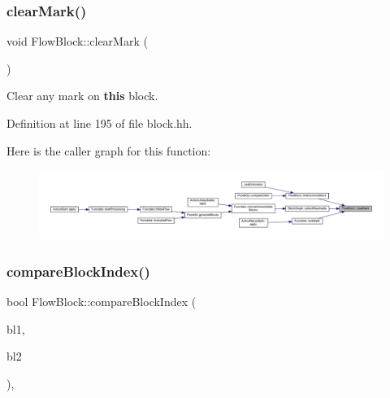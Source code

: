 \subsubsection{\texorpdfstring{clearMark()}{clearMark()}}
{\footnotesize\ttfamily void Flow\+Block\+::clear\+Mark (\begin{DoxyParamCaption}\item[{void}]{ }\end{DoxyParamCaption})\hspace{0.3cm}{\ttfamily [inline]}}



Clear any mark on {\bfseries{this}} block. 



Definition at line 195 of file block.\+hh.

Here is the caller graph for this function\+:
\nopagebreak
\begin{figure}[H]
\begin{center}
\leavevmode
\includegraphics[width=350pt]{class_flow_block_ad8fe7973ef5e53753ea0695ea2d3b7be_icgraph}
\end{center}
\end{figure}
\mbox{\label{class_flow_block_ac83c5d30331ddcae56c23c96088e2ce7}} 
\subsubsection{\texorpdfstring{compareBlockIndex()}{compareBlockIndex()}}
{\footnotesize\ttfamily bool Flow\+Block\+::compare\+Block\+Index (\begin{DoxyParamCaption}\item[{const \mbox{\hyperlink{class_flow_block}{Flow\+Block}} $\ast$}]{bl1,  }\item[{const \mbox{\hyperlink{class_flow_block}{Flow\+Block}} $\ast$}]{bl2 }\end{DoxyParamCaption})\hspace{0.3cm}{\ttfamily [inline]}, {\ttfamily [static]}}



